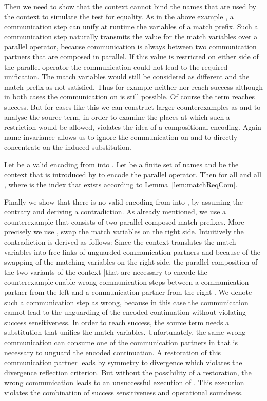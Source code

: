 \documentclass[final,copyright,creativecommons]{eptcs}
\begin{document}
Then we need to show that the context  cannot bind the names that are used by the context  to simulate the test for equality. As in the above example , a communication step can unify at runtime the variables of a match prefix. Such a communication step naturally transmits the value for the match variables over a parallel operator, because communication is always between two communication partners that are composed in parallel. If this value is restricted on either side of the parallel operator the communication could not lead to the required unification. The match variables would still be considered as different and the match prefix as not satisfied. Thus for example neither  nor  reach success although in both cases the communication on  is still possible. Of course the term  reaches success. But for cases like this we can construct larger counterexamples as  and to analyse the source term, in order to examine the places at which such a restriction would be allowed, violates the idea of a compositional encoding. Again name invariance allows us to ignore the communication on  and to directly concentrate on the induced substitution.

\begin{lemma}
	\label{lem:parContextNotRes}
	Let \encod be a valid encoding from \piT into \piNM.
	Let  be a finite set of names
	and  be the context that is introduced by  to encode the parallel operator.
	Then  for all  and all ,
	where  is the index that exists according to Lemma~\ref{lem:matchReqCom}.
\end{lemma}

Finally we show that there is no valid encoding from \piT into \piNM, by assuming the contrary and deriving a contradiction. As already mentioned, we use a counterexample that consists of two parallel composed match prefixes. More precisely we use , \ie swap the match variables on the right side. Intuitively the contradiction is derived as follows: Since the context  translates the match variables into free links of unguarded communication partners and because of the swapping of the matching variables on the right side, the parallel composition of the two variants of the context |that are necessary to encode the counterexample|enable wrong communication steps between a communication partner from the left  and a communication partner from the right . We denote such a communication step as wrong, because in this case the communication cannot lead to the unguarding of the encoded continuation  without violating success sensitiveness. In order to reach success, the source term needs a substitution  that unifies the match variables. Unfortunately, the same wrong communication can consume one of the communication partners in  that is necessary to unguard the encoded continuation. A restoration of this communication partner leads by symmetry to divergence which violates the divergence reflection criterion. But without the possibility of a restoration, the wrong communication leads to an unsuccessful execution of . This execution violates the combination of success sensitiveness and operational soundness.
\end{document}
